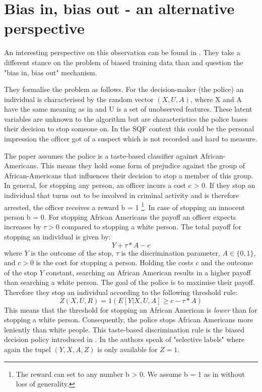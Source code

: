 \section*{Bias in, bias out - an alternative perspective}


An interesting perspective on this observation can be found in \cite{RambachanBBOEFW}. They take a different stance on the problem of biased training data than \cite{kallus} and question the "bias in, bias out" mechanism.

They formalise the problem as follows. For the decision-maker (the police) an individual is characterised by the random vector $(X, U, A)$, where X and A have the same meaning as in \cite{kallus}
and U is a set of unobserved features. These latent variables are unknown to the algorithm but are characteristics the police bases their decision to stop someone on. In the SQF context this could be the personal impression the officer got of a suspect which is not recorded and hard to measure.

The paper assumes the police is a taste-based classifier against African-Americans. This means they hold some form of prejudice against the group of African-Americans that influences their decision to stop a member of this group.
In general, for stopping any person, an officer incurs a cost c > 0. If they stop an individual that turns out to be involved in criminal activity and is therefore arrested, the officer receives a reward b = 1 \footnote{The reward can set to any number b > 0. We assume b = 1 as in \cite{RambachanBBOEFW} without loss of generality.}. In case of stopping an innocent person b = 0.
For stopping African Americans the payoff an officer expects increases by $\tau > 0$ compared to stopping a white person. The total payoff for stopping an individual is given by:
$$Y + \tau * A - c$$
where $Y$ is the outcome of the stop, $\tau$ is the discrimination parameter, $A \in \{0,1\}$, and $c > 0$ is the cost for stopping a person.
Holding the costs $c$ and the outcome of the stop $Y$ constant, searching an African American results in a higher payoff than searching a white person. The goal of the police is to maximise their payoff. Therefore they stop an individual according to the following threshold rule:
$$Z(X, U, R) = 1(E[Y|X, U, A] \ge c - \tau * A)$$
This means that the threshold for stopping an African American is \textit{lower} than for stopping a white person. Consequently, the police stops African Americans more leniently than white people.
This taste-based discrimination rule is the biased decision policy introduced in \cite{kallus}. In \cite{RambachanBBOEFW} the authors speak of "selective labels" where again the tupel $(Y, X, A, Z)$ is only available for $Z = 1$. 

